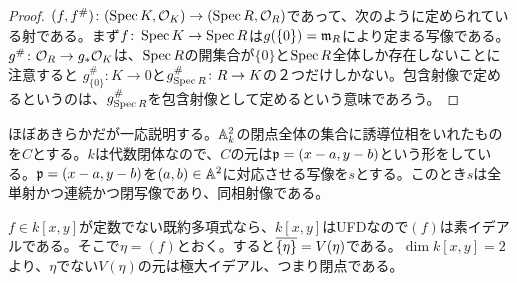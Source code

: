 \begin{proof}
  $(f,f^{\#}) \colon (\operatorname{Spec} K, \mathcal{O}_K) \to (\operatorname{Spec} R, \mathcal{O}_R)$であって、次のように定められている射である。まず$f \colon \operatorname{Spec} K \to \operatorname{Spec} R$は$g(\{ 0 \} ) = \mathfrak{m}_R$により定まる写像である。$g^{\# } \colon \mathcal{O}_R \to g_* \mathcal{O}_K$は、$\operatorname{Spec} R$の開集合が$\{0\}$と$\operatorname{Spec} R$全体しか存在しないことに注意すると
  $g_{ \{0\} }^{\#} \colon K \to 0$と$g^{\#}_{\operatorname{Spec} R} \colon R \to K$の２つだけしかない。包含射像で定めるというのは、$g^{\#}_{\operatorname{Spec} R}$を包含射像として定めるという意味であろう。
\end{proof}



\begin{rem}
  ほぼあきらかだが一応説明する。${\mathbb A}_k^2$の閉点全体の集合に誘導位相をいれたものを$C$とする。$k$は代数閉体なので、$C$の元は$\mathfrak{p} = (x-a,y-b)$という形をしている。$\mathfrak{p} = (x-a,y-b)$を$(a,b) \in {\mathbb A}^2$に対応させる写像を$s$とする。このとき$s$は全単射かつ連続かつ閉写像であり、同相射像である。
\end{rem}



\begin{rem}
  $f \in k[x,y]$が定数でない既約多項式なら、$k[x,y]$はUFDなので$(f)$は素イデアルである。そこで$\eta = (f)$とおく。すると$\overline{\{ \eta \} } = V(\eta)$である。$\dim k[x,y] =2$より、$\eta$でない$V(\eta)$の元は極大イデアル、つまり閉点である。
\end{rem}



